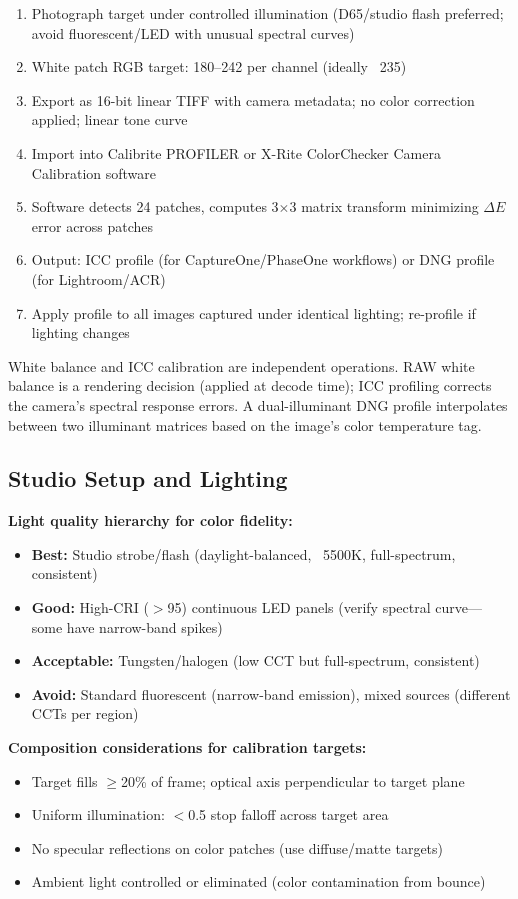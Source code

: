 \documentclass[11pt,letterpaper]{article}
\begin{document}
\begin{enumerate}[noitemsep]
  \item Photograph target under controlled illumination (D65/studio flash preferred; avoid fluorescent/LED with unusual spectral curves)
  \item White patch RGB target: 180--242 per channel (ideally ~235)
  \item Export as 16-bit linear TIFF with camera metadata; no color correction applied; linear tone curve
  \item Import into Calibrite PROFILER or X-Rite ColorChecker Camera Calibration software
  \item Software detects 24 patches, computes 3$\times$3 matrix transform minimizing $\Delta E$ error across patches
  \item Output: ICC profile (for CaptureOne/PhaseOne workflows) or DNG profile (for Lightroom/ACR)
  \item Apply profile to all images captured under identical lighting; re-profile if lighting changes
\end{enumerate}

White balance and ICC calibration are independent operations. RAW white balance is a rendering decision (applied at decode time); ICC profiling corrects the camera's spectral response errors. A dual-illuminant DNG profile interpolates between two illuminant matrices based on the image's color temperature tag.

\subsection{Studio Setup and Lighting}

\textbf{Light quality hierarchy for color fidelity:}
\begin{itemize}[noitemsep]
  \item \textbf{Best:} Studio strobe/flash (daylight-balanced, ~5500K, full-spectrum, consistent)
  \item \textbf{Good:} High-CRI ($>$95) continuous LED panels (verify spectral curve---some have narrow-band spikes)
  \item \textbf{Acceptable:} Tungsten/halogen (low CCT but full-spectrum, consistent)
  \item \textbf{Avoid:} Standard fluorescent (narrow-band emission), mixed sources (different CCTs per region)
\end{itemize}

\textbf{Composition considerations for calibration targets:}
\begin{itemize}[noitemsep]
  \item Target fills $\ge$20\% of frame; optical axis perpendicular to target plane
  \item Uniform illumination: $<$0.5 stop falloff across target area
  \item No specular reflections on color patches (use diffuse/matte targets)
  \item Ambient light controlled or eliminated (color contamination from bounce)
\end{itemize}
\end{document}
